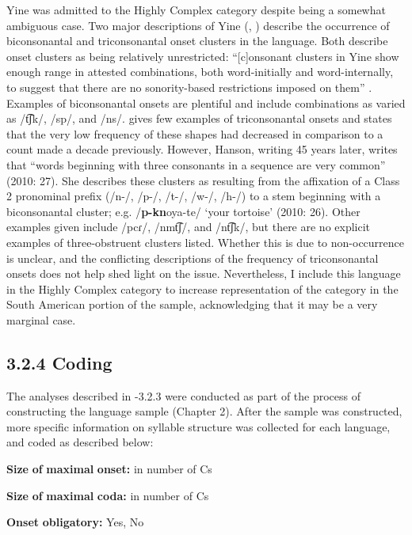   Yine was admitted to the Highly Complex category despite being a somewhat ambiguous case. Two major descriptions of Yine (\citealt{Hanson2010}, \citealt{Matteson1965}) describe the occurrence of biconsonantal and triconsonantal onset clusters in the language. Both describe onset clusters as being relatively unrestricted: “[c]onsonant clusters in Yine show enough range in attested combinations, both word-initially and word-internally, to suggest that there are no sonority-based restrictions imposed on them” \citep[27]{Hanson2010}. Examples of biconsonantal onsets are plentiful and include combinations as varied as /t͡ʃk/, /sp/, and /ns/. \citet[24]{Matteson1965} gives few examples of triconsonantal onsets and states that the very low frequency of these shapes had decreased in comparison to a count made a decade previously. However, Hanson, writing 45 years later, writes that “words beginning with three consonants in a sequence are very common” (2010: 27). She describes these clusters as resulting from the affixation of a Class 2 pronominal prefix (/n-/, /p-/, /t-/, /w-/, /h-/) to a stem beginning with a biconsonantal cluster; e.g. /\textbf{p-kn}oya-te/ ‘your tortoise’ (2010: 26). Other examples given include /pcɾ/, /nmt͡ʃ/, and /nt͡ʃk/, but there are no explicit examples of three-obstruent clusters listed. Whether this is due to non-occurrence is unclear, and the conflicting descriptions of the frequency of triconsonantal onsets does not help shed light on the issue. Nevertheless, I include this language in the Highly Complex category to increase representation of the category in the South American portion of the sample, acknowledging that it may be a very marginal case.

\subsection{3.2.4 Coding}

  The analyses described in -3.2.3 were conducted as part of the process of constructing the language sample (Chapter 2). After the sample was constructed, more specific information on syllable structure was collected for each language, and coded as described below:

\textbf{Size} \textbf{of} \textbf{maximal} \textbf{onset:} in number of Cs

\textbf{Size} \textbf{of} \textbf{maximal} \textbf{coda:} in number of Cs

\textbf{Onset} \textbf{obligatory:} Yes, No

